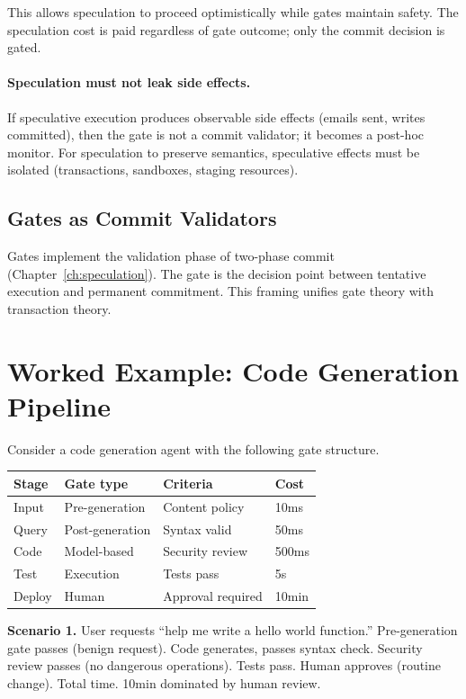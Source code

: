 This allows speculation to proceed optimistically while gates maintain safety. The speculation cost is paid regardless of gate outcome; only the commit decision is gated.

\paragraph{Speculation must not leak side effects.}
If speculative execution produces observable side effects (emails sent, writes committed), then the gate is not a commit validator; it becomes a post-hoc monitor. For speculation to preserve semantics, speculative effects must be isolated (transactions, sandboxes, staging resources).

\subsection{Gates as Commit Validators}

Gates implement the validation phase of two-phase commit (Chapter~\ref{ch:speculation}). The gate is the decision point between tentative execution and permanent commitment. This framing unifies gate theory with transaction theory.

\section{Worked Example: Code Generation Pipeline}

Consider a code generation agent with the following gate structure.

\begin{center}
\begin{tabular}{llll}
\toprule
Stage & Gate type & Criteria & Cost \\
\midrule
Input & Pre-generation & Content policy & 10ms \\
Query & Post-generation & Syntax valid & 50ms \\
Code & Model-based & Security review & 500ms \\
Test & Execution & Tests pass & 5s \\
Deploy & Human & Approval required & 10min \\
\bottomrule
\end{tabular}
\end{center}

\textbf{Scenario 1.} User requests ``help me write a hello world function.'' Pre-generation gate passes (benign request). Code generates, passes syntax check. Security review passes (no dangerous operations). Tests pass. Human approves (routine change). Total time. 10min dominated by human review.

